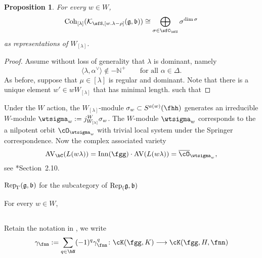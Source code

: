 \documentclass[12pt,a4paper]{amsart}
\newcommand{\AV}{\mathrm{AV}}
\newcommand{\AVC}{\mathrm{AV}_\bC}
\newcommand{\BN}{{\mathbb {N}}}
\newcommand{\CK}{{\mathcal {K}}}
\newcommand{\g}{\mathfrak g}
\renewcommand{\b}{\mathfrak b}
\newcommand{\la}{\langle}
\newcommand{\ra}{\rangle}
\numberwithin{equation}{section}
\newtheorem{prop}[thm]{Proposition}
\theoremstyle{remark}
\def\Gad{\Inn(\fgg)}
\def\Coh{\mathrm{Coh}}
\def\Inn{\mathrm{Inn}}
\newcommand{\Lam}{{[\lambda]}}
\newcommand{\Grt}{\cK}
\begin{document}
\begin{prop}
For every $w\in W$,
\[
  \Coh_{\Lam}( \CK_{\sfS, [ w.\lambda -\rho]}(\g,\b))\cong \bigoplus_{\sigma\in \sfC_{\sfS}} \sigma^{\dim \sigma}
\]
as representations of $W_\Lam$.
\end{prop}
\begin{proof}
Assume without loss of generality that $\lambda$ is dominant, namely
\[
  \la \lambda, \alpha^\vee\ra\notin -\BN^+\qquad\textrm{for all $\alpha\in \Delta$}.
\]
As before, suppose that $\mu\in \Lam$ is regular and dominant. Note that there is a unique element $w'\in w W_\Lam$ that has minimal length. such that

\end{proof}

Under the $W$ action, the $W_{[\lambda]}$-module
        $\sigma_{w}\subset S^{a(w)}(\fhh)$ generates an irreducible $W$-module
        $\wtsigma_{w}:=j_{W_{[\lambda]}}^{W}\sigma_{w}$. The $W$-module
        $\wtsigma_{w}$ corresponds to the a nilpotent orbit $\cO_{\wtsigma_{w}}$
        with trivial local system under the Springer correspondence. Now the
        complex associated variety
        \[
        \AVC(L(w\lambda)) = \Gad\cdot \AV(L(w\lambda)) =\bcO_{\wtsigma_{w}},
        \]
        see \cite{J.av}*{Section~2.10}.


$\Rep_{\Gamma}(\g,\b)$ for the subcategory of $\Rep_(\g,\b)$


For every $w\in W$,

\subsection{}

Retain the notation in , we write
\[
  \gamma_{\fnn}:= \sum_{q\in \bN} (-1)^{q} \gamma^{q}_{\fnn}\colon \Grt(\fgg,K) \longrightarrow \Grt(\fgg,H,\fnn)
\]

\end{document}
